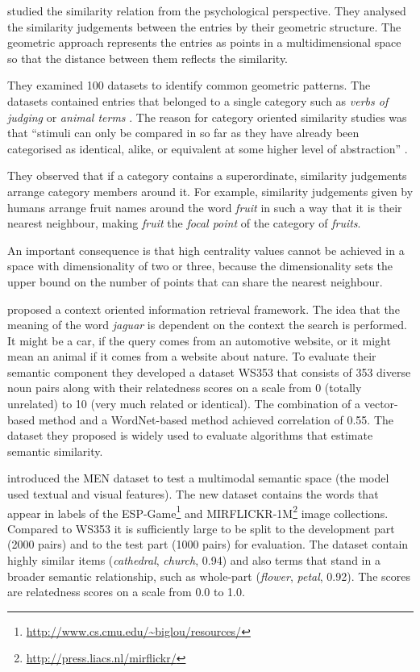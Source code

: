  studied the similarity relation from the psychological perspective. They analysed the similarity judgements between the entries by their geometric structure. The geometric approach represents the entries as points in a multidimensional space so that the distance between them reflects the similarity.

They examined 100 datasets to identify common geometric patterns. The datasets contained entries that belonged to a single category such as \textit{verbs of judging} \cite{FILLENBAUM197454} or \textit{animal terms} \cite{HENLEY1969176}. The reason for category oriented similarity studies was that ``stimuli can only be compared in so far as they have already been categorised as identical, alike, or equivalent at some higher level of abstraction'' \cite{turner1987rediscovering}.

They observed that if a category contains a superordinate, similarity judgements arrange category members around it. For example, similarity judgements given by humans arrange fruit names around the word \textit{fruit} in such a way that it is their nearest neighbour, making \textit{fruit} the \emph{focal point} of the category of \textit{fruits}.

An important consequence is that high centrality values cannot be achieved in a space with dimensionality of two or three,  because the dimensionality sets the upper bound on the number of points that can share the nearest neighbour.



 proposed a context oriented information retrieval framework. The idea that the meaning of the word \textit{jaguar} is dependent on the context the search is performed. It might be a car, if the query comes from an automotive website, or it might mean an animal if it comes from a website about nature. To evaluate their semantic component they developed a dataset WS353 that consists of 353 diverse noun pairs along with their relatedness scores on a scale from 0 (totally unrelated) to 10 (very much related or identical). The combination of a vector-based method and a WordNet-based method achieved correlation of 0.55. The dataset they proposed is widely used to evaluate algorithms that estimate semantic similarity.

 introduced the MEN dataset to test a multimodal semantic space (the model used textual and visual features). The new dataset contains the words that appear in labels of the ESP-Game\footnote{\url{http://www.cs.cmu.edu/~biglou/resources/}} and MIRFLICKR-1M\footnote{\url{http://press.liacs.nl/mirflickr/}} image collections. Compared to WS353 it is sufficiently large to be split to the development part (2000 pairs) and to the test part (1000 pairs) for evaluation. The dataset contain highly similar items (\textit{cathedral}, \textit{church}, 0.94) and also terms that stand in a broader semantic relationship, such as whole-part (\textit{flower}, \textit{petal}, 0.92). The scores are relatedness scores on a scale from 0.0 to 1.0.

